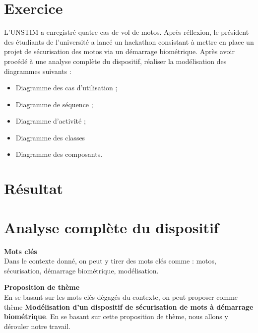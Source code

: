 \documentclass[a4paper,12pt]{article}
\begin{document}
	\section*{Exercice} 
	L'UNSTIM a enregistré quatre cas de vol de motos. Après réflexion, le président des étudiants de l'université a lancé un hackathon consistant à mettre en place un projet de sécurisation des motos via un démarrage biométrique. Après avoir procédé à une analyse complète du dispositif, réaliser la modélisation des diagrammes suivants : 
	\begin{itemize} 
		\item Diagramme des cas d'utilisation ; 
		\item Diagramme de séquence ; 
		\item Diagramme d'activité ; 
		\item Diagramme des classes
		\item Diagramme des composants. 
	\end{itemize} 
	
	\section*{Résultat} 
	
	\section{Analyse complète du dispositif} 
	\textbf{Mots clés} \\
	Dans le contexte donné, on peut y tirer des mots clés comme : motos, sécurisation, démarrage biométrique, modélisation.
	
	\textbf{Proposition de thème} \\
	En se basant sur les mots clés dégagés du contexte, on peut proposer comme thème \textbf{Modélisation d'un dispositif de sécurisation de mots à démarrage biométrique}. En se basant sur cette proposition de thème, nous allons y dérouler notre travail.
	
\end{document}
